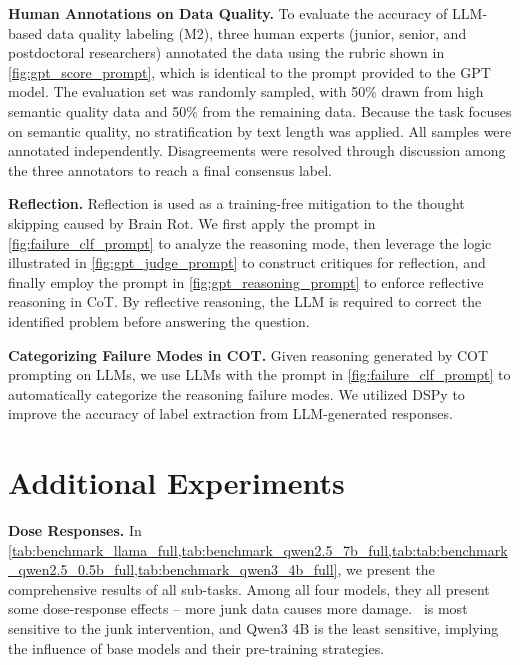 
\textbf{Human Annotations on Data Quality.} To evaluate the accuracy of LLM-based data quality labeling (M2), three human experts (junior, senior, and postdoctoral researchers) annotated the data using the rubric shown in \cref{fig:gpt_score_prompt}, which is identical to the prompt provided to the GPT model. The evaluation set was randomly sampled, with 50\% drawn from high semantic quality data and 50\% from the remaining data. Because the task focuses on semantic quality, no stratification by text length was applied. All samples were annotated independently. Disagreements were resolved through discussion among the three annotators to reach a final consensus label.


\textbf{Reflection.} Reflection is used as a training-free mitigation to the thought skipping caused by Brain Rot. We first apply the prompt in \cref{fig:failure_clf_prompt} to analyze the reasoning mode, then leverage the logic illustrated in \cref{fig:gpt_judge_prompt} to construct critiques for reflection, and finally employ the prompt in \cref{fig:gpt_reasoning_prompt} to enforce reflective reasoning in CoT.
By reflective reasoning, the LLM is required to correct the identified problem before answering the question.




\textbf{Categorizing Failure Modes in COT.}
Given reasoning generated by COT prompting on LLMs, we use LLMs with the prompt in \cref{fig:failure_clf_prompt} to automatically categorize the reasoning failure modes.
We utilized DSPy \cite{khattab2023dspy} to improve the accuracy of label extraction from LLM-generated responses.










\clearpage
\section{Additional Experiments}
\label{app:exps}

\textbf{Dose Responses.}
In \cref{tab:benchmark_llama_full,tab:benchmark_qwen2.5_7b_full,tab:tab:benchmark_qwen2.5_0.5b_full,tab:benchmark_qwen3_4b_full}, we present the comprehensive results of all sub-tasks.
Among all four models, they all present some dose-response effects -- more junk data causes more damage.
\llama\ is most sensitive to the junk intervention, and Qwen3 4B is the least sensitive, implying the influence of base models and their pre-training strategies. 


